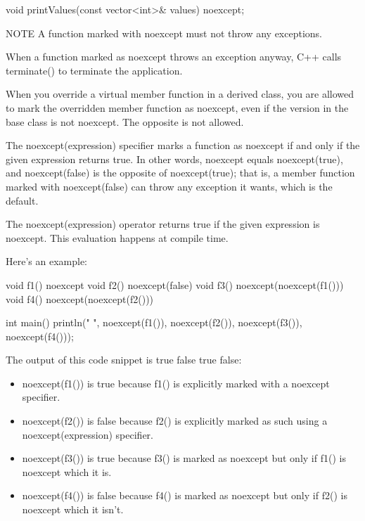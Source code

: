 \begin{cpp}
void printValues(const vector<int>& values) noexcept;
\end{cpp}

\begin{myNotic}{NOTE}
A function marked with noexcept must not throw any exceptions.
\end{myNotic}

When a function marked as noexcept throws an exception anyway, C++ calls terminate() to terminate the application.

When you override a virtual member function in a derived class, you are allowed to mark the overridden member function as noexcept, even if the version in the base class is not noexcept. The opposite is not allowed.


The noexcept(expression) specifier marks a function as noexcept if and only if the given expression returns true. In other words, noexcept equals noexcept(true), and noexcept(false) is the opposite of noexcept(true); that is, a member function marked with noexcept(false) can throw any exception it wants, which is the default.


The noexcept(expression) operator returns true if the given expression is noexcept. This evaluation happens at compile time.

Here’s an example:

\begin{cpp}
void f1() noexcept {}
void f2() noexcept(false) {}
void f3() noexcept(noexcept(f1())) {}
void f4() noexcept(noexcept(f2())) {}

int main()
{
    println("{} {} {} {}", noexcept(f1()),
                           noexcept(f2()),
                           noexcept(f3()),
                           noexcept(f4()));
}
\end{cpp}

The output of this code snippet is true false true false:

\begin{itemize}
\item
noexcept(f1()) is true because f1() is explicitly marked with a noexcept specifier.

\item
noexcept(f2()) is false because f2() is explicitly marked as such using a noexcept(expression) specifier.

\item
noexcept(f3()) is true because f3() is marked as noexcept but only if f1() is noexcept which it is.

\item
noexcept(f4()) is false because f4() is marked as noexcept but only if f2() is noexcept which it isn’t.
\end{itemize}

